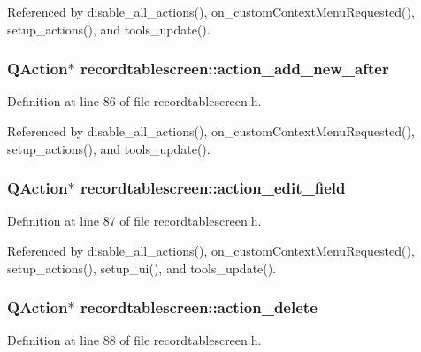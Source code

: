 Referenced by disable\_\-all\_\-actions(), on\_\-custom\-Context\-Menu\-Requested(), setup\_\-actions(), and tools\_\-update().
\subsubsection{\setlength{\rightskip}{0pt plus 5cm}QAction$\ast$ {\bf recordtablescreen::action\_\-add\_\-new\_\-after}\hspace{0.3cm}{\tt  [private]}}\label{classrecordtablescreen_350b6410856141258b1d324686e26b09}




Definition at line 86 of file recordtablescreen.h.

Referenced by disable\_\-all\_\-actions(), on\_\-custom\-Context\-Menu\-Requested(), setup\_\-actions(), and tools\_\-update().
\subsubsection{\setlength{\rightskip}{0pt plus 5cm}QAction$\ast$ {\bf recordtablescreen::action\_\-edit\_\-field}\hspace{0.3cm}{\tt  [private]}}\label{classrecordtablescreen_3cbd66091b8a77cfa75ca9b61edc9f6f}




Definition at line 87 of file recordtablescreen.h.

Referenced by disable\_\-all\_\-actions(), on\_\-custom\-Context\-Menu\-Requested(), setup\_\-actions(), setup\_\-ui(), and tools\_\-update().
\subsubsection{\setlength{\rightskip}{0pt plus 5cm}QAction$\ast$ {\bf recordtablescreen::action\_\-delete}\hspace{0.3cm}{\tt  [private]}}\label{classrecordtablescreen_fd4cb6265dd10d559f8d0244043dae42}




Definition at line 88 of file recordtablescreen.h.

